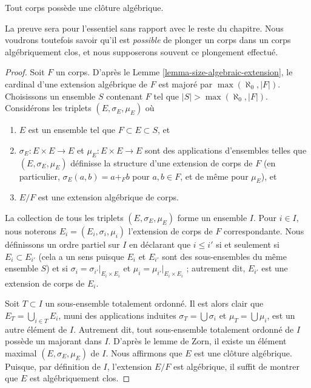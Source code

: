 \begin{theorem}
\label{theorem-existence-algebraic-closure}
Tout corps possède une clôture algébrique.
\end{theorem}

\noindent
La preuve sera pour l'essentiel sans rapport avec le reste du chapitre. Nous voudrons toutefois
savoir qu'il est {\it possible} de plonger un corps dans un
corps algébriquement clos, et nous supposerons souvent ce plongement effectué.

\begin{proof}
Soit $F$ un corps. D'après le Lemme \ref{lemma-size-algebraic-extension}, le
cardinal d'une extension algébrique de $F$ est majoré par
$\max(\aleph_0, |F|)$. Choisissons un ensemble $S$ contenant $F$ tel que
$|S| > \max(\aleph_0, |F|)$. Considérons les triplets
$(E, \sigma_E, \mu_E)$ où
\begin{enumerate}
\item $E$ est un ensemble tel que $F \subset E \subset S$, et
\item $\sigma_E : E \times E \to E$ et $\mu_E : E \times E \to E$
sont des applications d'ensembles telles que $(E, \sigma_E, \mu_E)$ définisse la structure
d'une extension de corps de $F$ (en particulier, $\sigma_E(a, b) = a +_F b$
pour $a, b \in F$, et de même pour $\mu_E$), et
\item $E/F$ est une extension algébrique de corps.
\end{enumerate}
La collection de tous les triplets $(E, \sigma_E, \mu_E)$ forme un ensemble $I$.
Pour $i \in I$, nous noterons $E_i = (E_i, \sigma_i, \mu_i)$ l'extension de corps
de $F$ correspondante. Nous définissons un ordre partiel sur
$I$ en déclarant que $i \leq i'$ si et seulement si $E_i \subset E_{i'}$
(cela a un sens puisque $E_i$ et $E_{i'}$ sont des sous-ensembles du même ensemble $S$)
et si $\sigma_i = \sigma_{i'}|_{E_i \times E_i}$ et
$\mu_i = \mu_{i'}|_{E_i \times E_i}$ ; autrement dit, $E_{i'}$ est une extension de corps
de $E_i$.

\medskip\noindent
Soit $T \subset I$ un sous-ensemble totalement ordonné. Il est alors clair que
$E_T = \bigcup_{i \in T} E_i$, muni des applications induites $\sigma_T = \bigcup \sigma_i$
et $\mu_T = \bigcup \mu_i$, est un autre élément de $I$. Autrement dit,
tout sous-ensemble totalement ordonné de $I$ possède un majorant dans $I$. D'après le lemme de Zorn,
il existe un élément maximal $(E, \sigma_E, \mu_E)$ de $I$. Nous affirmons que
$E$ est une clôture algébrique. Puisque, par définition de $I$, l'extension
$E/F$ est algébrique, il suffit de montrer que $E$ est algébriquement clos.


\end{proof}

